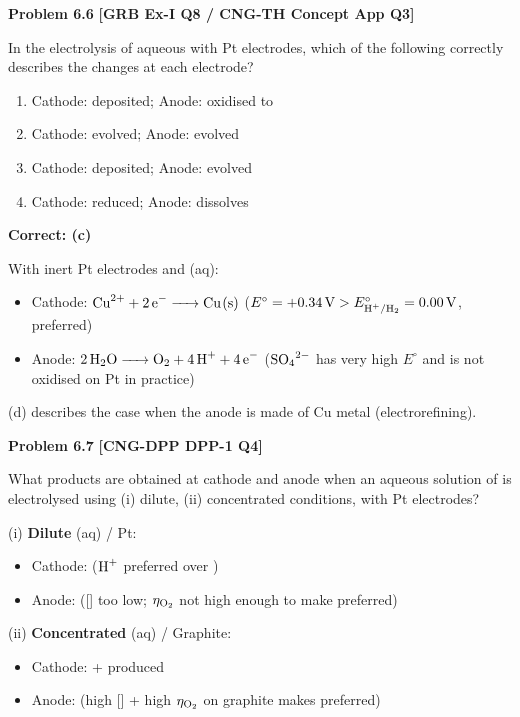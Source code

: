 \begin{problembox}
\textbf{Problem 6.6} \hfill \textbf{[GRB Ex-I Q8 / CNG-TH Concept App Q3]}

In the electrolysis of aqueous  with Pt electrodes, which of the following correctly describes the changes at each electrode?
\begin{enumerate}[label=(\alph*)]
    \item Cathode:  deposited; Anode:  oxidised to 
    \item Cathode:  evolved; Anode:  evolved
    \item Cathode:  deposited; Anode:  evolved
    \item Cathode:  reduced; Anode:  dissolves
\end{enumerate}
\end{problembox}
\begin{solution}
\textbf{Correct: (c)}

With inert Pt electrodes and (aq):
\begin{itemize}
    \item Cathode: $\ce{Cu^2+ + 2e^- -> Cu(s)}$ ($E^\circ = +0.34\,\text{V} > E^\circ_{\ce{H+/H2}} = 0.00\,\text{V}$, preferred)
    \item Anode: $\ce{2H2O -> O2 + 4H+ + 4e^-}$ ($\ce{SO4^2-}$ has very high $E^\circ$ and is not oxidised on Pt in practice)
\end{itemize}
(d) describes the case when the anode is made of Cu metal (electrorefining).
\end{solution}

\begin{problembox}
\textbf{Problem 6.7} \hfill \textbf{[CNG-DPP DPP-1 Q4]}

What products are obtained at cathode and anode when an aqueous solution of  is electrolysed using (i) dilute, (ii) concentrated conditions, with Pt electrodes?
\end{problembox}
\begin{solution}
(i) \textbf{Dilute} (aq) / Pt:
\begin{itemize}
    \item Cathode:  ($\ce{H+}$ preferred over )
    \item Anode:  ([] too low; $\eta_{\ce{O2}}$ not high enough to make  preferred)
\end{itemize}
(ii) \textbf{Concentrated} (aq) / Graphite:
\begin{itemize}
    \item Cathode:  +  produced
    \item Anode:  (high [] + high $\eta_{\ce{O2}}$ on graphite makes  preferred)
\end{itemize}
\end{solution}

